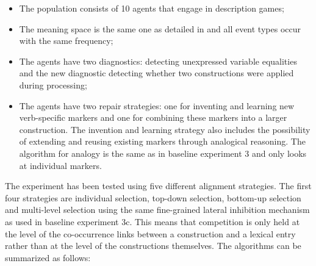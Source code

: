 \begin{itemize}
\item The population consists of 10 agents that engage in description games;
\item The meaning space is the same one as detailed in  and all event types occur with the same frequency;
\item The agents have two diagnostics: detecting unexpressed variable equalities and the new diagnostic detecting whether two constructions were applied during processing;
\item The agents have two repair strategies: one for inventing and learning new verb-specific markers and one for combining these markers into a larger construction. The invention and learning strategy also includes the possibility of extending and reusing existing markers through analogical reasoning. The algorithm for analogy is the same as in baseline experiment 3 and only looks at individual markers.
\end{itemize}

The experiment has been tested using five different alignment strategies. The first four strategies are individual selection, top-down selection, bottom-up selection and multi-level selection using the same fine-grained lateral inhibition mechanism as used in baseline experiment 3c. This means that competition is only held at the level of the co-occurrence links between a construction and a lexical entry rather than at the level of the constructions themselves. The algorithms can be summarized as follows:

